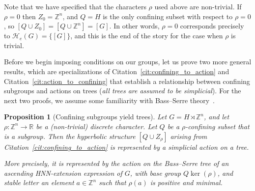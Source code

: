 \documentclass[10pt,a4paper]{article}
\newtheorem{prop}[cdrthm]{Proposition}
\theoremstyle{definition}
\theoremstyle{remark}
\newcommand{\Z}{\mathbb{Z}}
\newcommand{\R}{\mathbb{R}}
\newcommand{\Hyp}{\mathcal{H}}
\theoremstyle{plain}
\begin{document}
Note that we have specified that the characters $\rho$ used above are non-trivial. If $\rho=0$ then $Z_0=\Z^n$, and $Q=H$ is the only confining subset with respect to $\rho=0$, so $[Q\cup Z_0]=[Q\cup \Z^n]=[G]$. In other words, $\rho=0$ corresponds precisely to $\Hyp_e(G)=\{[G]\}$, and this is the end of the story for the case when $\rho$ is trivial.

Before we begin imposing conditions on our groups, let us prove two more general results, which are specializations of Citation~\ref{cit:confining_to_action} and Citation~\ref{cit:action_to_confining} that establish a relationship between confining subgroups and actions on trees (\emph{all trees are assumed to be simplicial}). For the next two proofs, we assume some familiarity with Bass--Serre theory~\cite{serre}.

\begin{prop}[Confining subgroups yield trees]\label{prop:subgroups_to_trees}
Let $G=H\rtimes \Z^n$, and let $\rho\colon \Z^n\to \R$ be a (non-trivial) discrete character. Let $Q$ be a $\rho$-confining subset that is a subgroup. Then the hyperbolic structure $[Q\cup Z_\rho]$ arising from Citation~\ref{cit:confining_to_action} is represented by a simplicial action on a tree.

More precisely, it is represented by the action on the Bass--Serre tree of an ascending HNN-extension expression of $G$, with base group $Q \ker(\rho)$, and stable letter an element $a \in \Z^n$ such that $\rho(a)$ is positive and minimal.
\end{prop}
\end{document}
